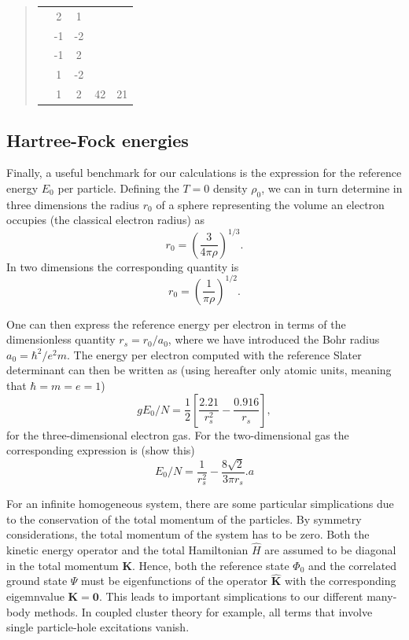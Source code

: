 \documentclass[%
oneside,                 %
final,                   %
10pt]{article}
\begin{document}
\begin{quote}
\begin{tabular}{ccccc}
                      & 2       & 1       &                            &                          \\
                      & -1      & -2      &                            &                          \\
                      & -1      & 2       &                            &                          \\
                      & 1       & -2      &                            &                          \\
                      & 1       & 2       & 42                         & 21                       \\
\hline
\end{tabular}
\end{quote}

\noindent
\subsection*{Hartree-Fock energies}

Finally, a useful benchmark for our calculations is the expression for
the reference energy $E_0$ per particle.
Defining the $T=0$ density $\rho_0$, we can in turn determine in three
dimensions the radius $r_0$ of a sphere representing the volume an
electron occupies (the classical electron radius) as
\[
r_0= \left(\frac{3}{4\pi \rho}\right)^{1/3}.
\]
In two dimensions the corresponding quantity is
\[
r_0= \left(\frac{1}{\pi \rho}\right)^{1/2}.
\]


One can then express the reference energy per electron in terms of the
dimensionless quantity $r_s=r_0/a_0$, where we have introduced the
Bohr radius $a_0=\hbar^2/e^2m$. The energy per electron computed with
the reference Slater determinant can then be written as
(using hereafter only atomic units, meaning that $\hbar = m = e = 1$)
\[g
E_0/N=\frac{1}{2}\left[\frac{2.21}{r_s^2}-\frac{0.916}{r_s}\right],
\]
for the three-dimensional electron gas.  For the two-dimensional gas
the corresponding expression is (show this)
\[
E_0/N=\frac{1}{r_s^2}-\frac{8\sqrt{2}}{3\pi r_s}.a
\]


For an infinite homogeneous system, there are some particular
simplications due to the conservation of the total momentum of the
particles.  By symmetry considerations, the total momentum of the
system has to be zero. Both the kinetic energy operator and the
total Hamiltonian $\hat{H}$ are assumed to be diagonal in the total
momentum $\mathbf{K}$. Hence, both the reference state $\Phi_{0}$ and
the correlated ground state $\Psi$ must be eigenfunctions of the
operator $\mathbf{\hat{K}}$ with the corresponding eigemnvalue
$\mathbf{K} = \mathbf{0}$.  This leads to important
simplications to our different many-body methods. In coupled cluster
theory for example, all
terms that involve single particle-hole excitations vanish. 
\end{document}
